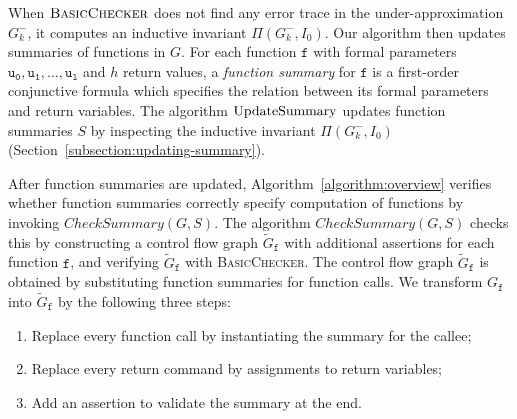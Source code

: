 When $\textsc{BasicChecker}$ does not find any error trace in the
under-approximation $G^-_k$, it computes an inductive
invariant $\Pi (G^-_k, I_0)$. Our algorithm then updates
summaries of functions in $G$. For each function $\mathtt{f}$ with
formal parameters $\mathtt{u_0}, \mathtt{u_1}, \ldots, \mathtt{u_l}$
and $h$ return values, a \emph{function summary} for $\mathtt{f}$ is a
first-order conjunctive formula which specifies the relation between
its formal parameters and return variables. The algorithm
$\textmd{UpdateSummary}$ updates function summaries $S$ by inspecting
the inductive invariant $\Pi (G^-_k, I_0)$
(Section~\ref{subsection:updating-summary}). 

After function summaries are updated, Algorithm~\ref{algorithm:overview} 
verifies whether function summaries correctly specify computation of
functions by invoking $\mathit{CheckSummary} (G, S)$. The algorithm
$\mathit{CheckSummary} (G, S)$ checks this by constructing a control flow 
graph $\tilde{G}_{\mathtt{f}}$ with additional assertions for each
function $\mathtt{f}$, and verifying $\tilde{G}_{\mathtt{f}}$ with
\textsc{BasicChecker}. The control flow graph
$\tilde{G}_{\mathtt{f}}$ is obtained by substituting function
summaries for function calls.
We transform $G_{\mathtt{f}}$ into $\tilde{G}_{\mathtt{f}}$ by the
following three steps:
\begin{enumerate}
\item Replace every function call by instantiating the summary for the
  callee;
\item Replace every return command by assignments to return variables;
\item Add an assertion to validate the summary at the end.
\end{enumerate}

